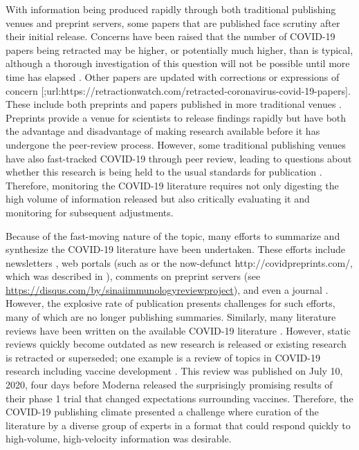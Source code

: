 \documentclass[sigconf]{acmart}
\begin{document}
With information being produced rapidly through both traditional publishing venues and preprint servers, some papers that are published face scrutiny after their initial release.
Concerns have been raised that the number of COVID-19 papers being retracted may be higher, or potentially much higher, than is typical, although a thorough investigation of this question will not be possible until more time has elapsed \citep{ZUk10707, caxpZEmy}.
Other papers are updated with corrections or expressions of concern {[}\citet{caxpZEmy};url:https://retractionwatch.com/retracted-coronavirus-covid-19-papers{]}.
These include both preprints and papers published in more traditional venues \citep{hfAF6aDr, paRLhIdE}.
Preprints provide a venue for scientists to release findings rapidly but have both the advantage and disadvantage of making research available before it has undergone the peer-review process.
However, some traditional publishing venues have also fast-tracked COVID-19 through peer review, leading to questions about whether this research is being held to the usual standards for publication \citep{1Dez1ZOc5}.
Therefore, monitoring the COVID-19 literature requires not only digesting the high volume of information released but also critically evaluating it and monitoring for subsequent adjustments.

Because of the fast-moving nature of the topic, many efforts to summarize and synthesize the COVID-19 literature have been undertaken.
These efforts include newsletters \citetext{\citealp{d204tUzq}; \citealp{JdWiPJCL}}, web portals (such as \citep{m4B8roc9, 1CBWvhTdy} or the now-defunct http://covidpreprints.com/, which was described in \citep{paRLhIdE}), comments on preprint servers \citep{YZ4cHNuH} (see \url{https://disqus.com/by/sinaiimmunologyreviewproject}), and even a journal \citep{oBoqEGzZ}.
However, the explosive rate of publication presents challenges for such efforts, many of which are no longer publishing summaries.
Similarly, many literature reviews have been written on the available COVID-19 literature \citep{I2EsJmfs, 5x25saIz, evtsR3C5, 5x25saIz, 18eCxyLhx, SAE5ME3N, xOs5ctsW}.
However, static reviews quickly become outdated as new research is released or existing research is retracted or superseded; one example is a review of topics in COVID-19 research including vaccine development \citep{xOs5ctsW}.
This review was published on July 10, 2020, four days before Moderna released the surprisingly promising results of their phase 1 trial \citep{wiGjCZC8} that changed expectations surrounding vaccines.
Therefore, the COVID-19 publishing climate presented a challenge where curation of the literature by a diverse group of experts in a format that could respond quickly to high-volume, high-velocity information was desirable.
\end{document}
